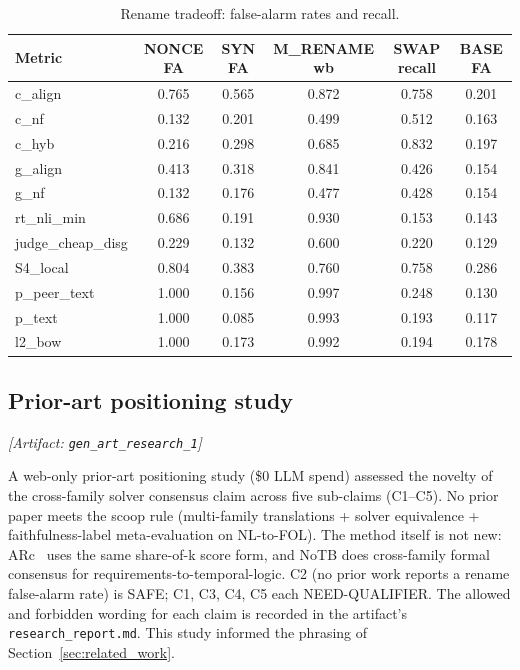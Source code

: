 \documentclass[11pt,letterpaper]{article}
\begin{document}
\begin{table}[!htbp]
\centering
\caption{Rename tradeoff: false-alarm rates and recall.}
\label{tab:rename_tradeoff}
\small
\begin{tabular}{lccccc}
\toprule
Metric & NONCE FA & SYN FA & M\_RENAME wb & SWAP recall & BASE FA \\
\midrule
c\_align & 0.765 & 0.565 & 0.872 & 0.758 & 0.201 \\
c\_nf & 0.132 & 0.201 & 0.499 & 0.512 & 0.163 \\
c\_hyb & 0.216 & 0.298 & 0.685 & 0.832 & 0.197 \\
g\_align & 0.413 & 0.318 & 0.841 & 0.426 & 0.154 \\
g\_nf & 0.132 & 0.176 & 0.477 & 0.428 & 0.154 \\
rt\_nli\_min & 0.686 & 0.191 & 0.930 & 0.153 & 0.143 \\
judge\_cheap\_disg & 0.229 & 0.132 & 0.600 & 0.220 & 0.129 \\
S4\_local & 0.804 & 0.383 & 0.760 & 0.758 & 0.286 \\
p\_peer\_text & 1.000 & 0.156 & 0.997 & 0.248 & 0.130 \\
p\_text & 1.000 & 0.085 & 0.993 & 0.193 & 0.117 \\
l2\_bow & 1.000 & 0.173 & 0.992 & 0.194 & 0.178 \\
\bottomrule
\end{tabular}
\end{table}

\subsection{Prior-art positioning study}
\label{sec:research1}
\noindent\textit{[Artifact: \texttt{gen\_art\_research\_1}]}

A web-only prior-art positioning study (\$0 LLM spend) assessed the novelty of the cross-family solver consensus claim across five sub-claims (C1--C5). No prior paper meets the scoop rule (multi-family translations + solver equivalence + faithfulness-label meta-evaluation on NL-to-FOL). The method itself is not new: ARc~\citep{Bayless2025} uses the same share-of-k score form, and NoTB does cross-family formal consensus for requirements-to-temporal-logic. C2 (no prior work reports a rename false-alarm rate) is SAFE; C1, C3, C4, C5 each NEED-QUALIFIER. The allowed and forbidden wording for each claim is recorded in the artifact's \texttt{research\_report.md}. This study informed the phrasing of Section~\ref{sec:related_work}.
\end{document}
